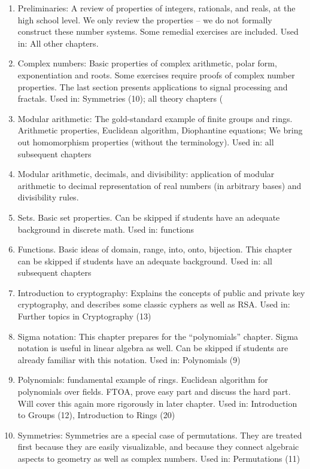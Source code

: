 \begin{enumerate}
\item
Preliminaries: A review of properties of integers, rationals, and reals, at the high school level. We only review the properties -- we do not formally construct these number systems. Some remedial exercises are included.  Used in: All other chapters.
\item
Complex numbers: Basic properties of complex arithmetic, polar form, exponentiation and roots. Some exercises require proofs of complex number properties.  The last section presents applications to signal processing and fractals. Used in: Symmetries (10); all theory chapters (  
\item
Modular arithmetic:  The gold-standard example of finite groups and rings.  Arithmetic properties, Euclidean algorithm, Diophantine equations; We bring out homomorphism properties (without the terminology).  Used in: all subsequent chapters
\item
Modular arithmetic, decimals, and divisibility: application of modular arithmetic to decimal representation of real numbers (in arbitrary bases) and divisibility rules. 
\item
Sets.  Basic set properties. Can be skipped if students have an adequate background in discrete math. Used in: functions
\item
Functions. Basic ideas of domain, range, into, onto, bijection.  This chapter can be skipped if students have an adequate background.  Used in: all subsequent chapters
\item
Introduction to cryptography:  Explains the concepts of public and private key cryptography, and describes some classic cyphers as well as RSA. Used in:  Further topics in Cryptography (13)
\item
Sigma notation: This chapter prepares for the ``polynomials'' chapter.  Sigma notation is useful in linear algebra as well. Can be skipped if students are already familiar with this notation. Used in: Polynomials (9) 
\item
Polynomials: fundamental example of rings. Euclidean algorithm for polynomials over fields. FTOA, prove easy part and discuss the hard part.  Will cover this again more rigorously in later chapter. Used in:  Introduction to Groups (12), Introduction to Rings (20)
\item
Symmetries: Symmetries are a special case of permutations. They are treated first because they are easily visualizable, and because they connect algebraic aspects to geometry as well as complex numbers.  Used in:  Permutations (11)

\end{enumerate}
